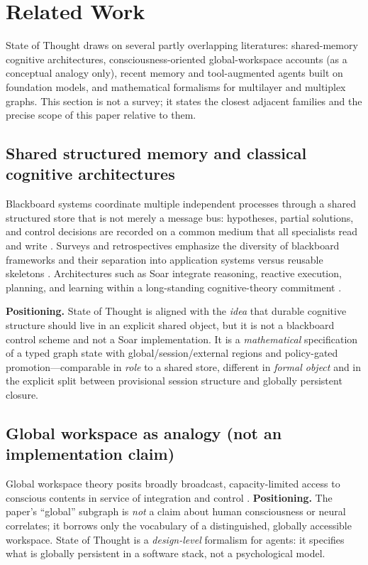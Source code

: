 \section{Related Work}
\label{sec:related}

State of Thought draws on several partly overlapping literatures: shared-memory cognitive architectures, consciousness-oriented global-workspace accounts (as a conceptual analogy only), recent memory and tool-augmented agents built on foundation models, and mathematical formalisms for multilayer and multiplex graphs.
This section is not a survey; it states the closest adjacent families and the precise scope of this paper relative to them.

\subsection{Shared structured memory and classical cognitive architectures}
\label{subsec:rel-shared}

Blackboard systems coordinate multiple independent processes through a shared structured store that is not merely a message bus: hypotheses, partial solutions, and control decisions are recorded on a common medium that all specialists read and write \citep{erm1980hearsayii,nii1986blackboard}.
Surveys and retrospectives emphasize the diversity of blackboard frameworks and their separation into application systems versus reusable skeletons \citep{nii1986blackboard}.
Architectures such as Soar integrate reasoning, reactive execution, planning, and learning within a long-standing cognitive-theory commitment \citep{laird2012soar}.

\textbf{Positioning.}
State of Thought is aligned with the \emph{idea} that durable cognitive structure should live in an explicit shared object, but it is not a blackboard control scheme and not a Soar implementation.
It is a \emph{mathematical} specification of a typed graph state with global/session/external regions and policy-gated promotion---comparable in \emph{role} to a shared store, different in \emph{formal object} and in the explicit split between provisional session structure and globally persistent closure.

\subsection{Global workspace as analogy (not an implementation claim)}
\label{subsec:rel-gwt}

Global workspace theory posits broadly broadcast, capacity-limited access to conscious contents in service of integration and control \citep{baars2005gwt}.
\textbf{Positioning.}
The paper's ``global'' subgraph is \emph{not} a claim about human consciousness or neural correlates; it borrows only the vocabulary of a distinguished, globally accessible workspace.
State of Thought is a \emph{design-level} formalism for agents: it specifies what is globally persistent in a software stack, not a psychological model.

